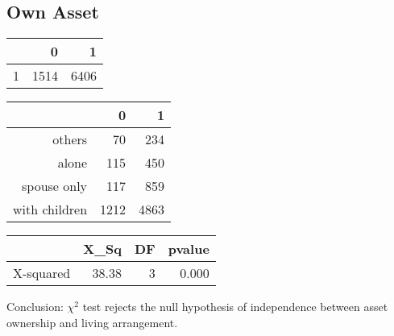 \documentclass[11pt]{article}
\begin{document}
\newpage
\subsection*{Own Asset}

\begin{table}[ht]
\centering
\begin{tabular}{rrr}
  \hline
 & 0 & 1 \\ 
  \hline
1 & 1514 & 6406 \\ 
   \hline
\end{tabular}
\end{table}%
\begin{table}[ht]
\centering
\begin{tabular}{rrr}
  \hline
 & 0 & 1 \\ 
  \hline
others &  70 & 234 \\ 
  alone & 115 & 450 \\ 
  spouse only & 117 & 859 \\ 
  with children & 1212 & 4863 \\ 
   \hline
\end{tabular}
\end{table}%
\begin{table}[ht]
\centering
\begin{tabular}{rrrr}
  \hline
 & X\_Sq & DF & pvalue \\ 
  \hline
X-squared & 38.38 & 3 & 0.000 \\ 
   \hline
\end{tabular}
\end{table}Conclusion: $\chi^2$ test rejects the null hypothesis of independence between asset ownership and living arrangement. 

\newpage
\end{document}
